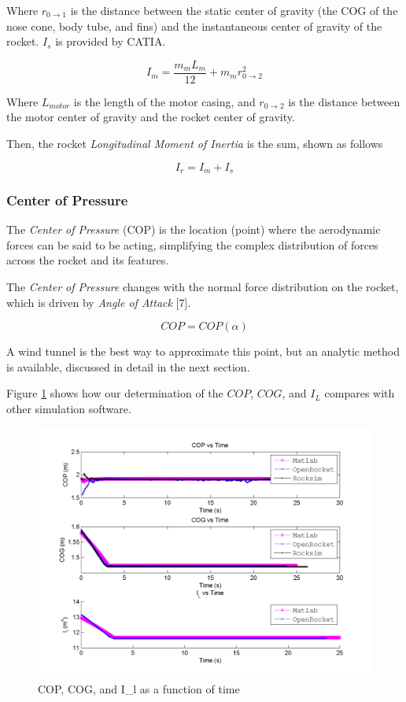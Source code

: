 \documentclass[]{article}
\begin{document}
Where \(r_{0 \rightarrow 1}\) is the distance between the static center
of gravity (the COG of the nose cone, body tube, and fins) and the
instantaneous center of gravity of the rocket. \(I_{s}\) is provided by
CATIA.

\begin{equation}
\label{motor_longitudinal_moment_inertia}
I_{m} = \dfrac{m_{m}L_{m}}{12} + m_{m}r_{0 \rightarrow 2}^2
\end{equation}

Where \(L_{motor}\) is the length of the motor casing, and
\(r_{0 \rightarrow 2}\) is the distance between the motor center of
gravity and the rocket center of gravity.

Then, the rocket \emph{Longitudinal Moment of Inertia} is the sum, shown
as follows

\begin{equation}
\label{rocket_longitudinal_moment_inertia}
I_{r} = I_{m} + I_{s}
\end{equation}

\subsubsection{Center of Pressure}\label{center-of-pressure}

The \emph{Center of Pressure} (COP) is the location (point) where the
aerodynamic forces can be said to be acting, simplifying the complex
distribution of forces across the rocket and its features.

The \emph{Center of Pressure} changes with the normal force distribution
on the rocket, which is driven by \emph{Angle of Attack} {[}7{]}.

\[ COP = COP(\alpha) \]

A wind tunnel is the best way to approximate this point, but an analytic
method is available, discussed in detail in the next section.

Figure \ref{cop_cog_il_figure} shows how our determination of the
\(COP\), \(COG\), and \(I_L\) compares with other simulation software.

\begin{figure}[htbp]
\centering
\includegraphics{images/plots/error_cog_cop_il_plot.png}
\caption{COP, COG, and I\_l as a function of time
\label{cop_cog_il_figure}}
\end{figure}
\end{document}
